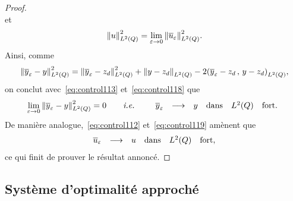 \begin{proof}
\begin{equation}
    \end{equation}
    et
    \begin{equation}\label{eq:control119}
        {\left\|{u }\right\|}_{L^{2}\left({Q}\right)}^{2} = \lim_{\varepsilon\to 0}{\left\|{{\overline{u}}_{\varepsilon} }\right\|}_{L^{2}\left({Q}\right)}^{2}.
    \end{equation}
    Ainsi, comme
    \begin{equation*}
        \normecq{\bareps{y} - y} = \normecq{\bareps{y} - z_{d}} + \normeq{y
        - z_{d}} -2\scalaireq{%
            \bareps{y} - z_{d}
        }{%
            y - z_{d}
        },
    \end{equation*}
    on conclut avec~\eqref{eq:control113} et~\eqref{eq:control118} que
    \begin{equation*}\label{eq:control120}
        \lim_{\varepsilon\to 0}{\left\|{{\overline{y}}_{\varepsilon} - y }\right\|}_{L^{2}\left({Q}\right)}^{2} = 0\qquad\textit{i.e.}\qquad
        \begin{array}{rcllll}
            {\overline{y}}_{\varepsilon} & \longrightarrow & y & \text{dans} & L^{2}\!\left({Q}\right) &
            \text{fort}.
        \end{array}
    \end{equation*}
    De manière analogue,~\eqref{eq:control112} et~\eqref{eq:control119}
    amènent que
    \begin{equation*}
        \begin{array}{rcllll}
            {\overline{u}}_{\varepsilon} & \longrightarrow & u & \text{dans} & L^{2}\!\left({Q}\right) &
            \text{fort},
        \end{array}
    \end{equation*}
    ce qui finit de prouver le résultat annoncé.
\end{proof}

\subsection{Système d'optimalité approché}\label{sec:approachedso}

